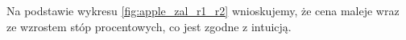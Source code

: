 \documentclass[]{pwr_wmat_praca_dyplomowa}
\theoremstyle{plain}
\numberwithin{theorem}{chapter}
\theoremstyle{definition}
\numberwithin{theorem}{chapter}
\begin{document}
Na podstawie wykresu \ref{fig:apple_zal_r1_r2} wnioskujemy, że cena maleje wraz ze wzrostem stóp procentowych, co jest zgodne z intuicją.



\newpage
\end{document}
